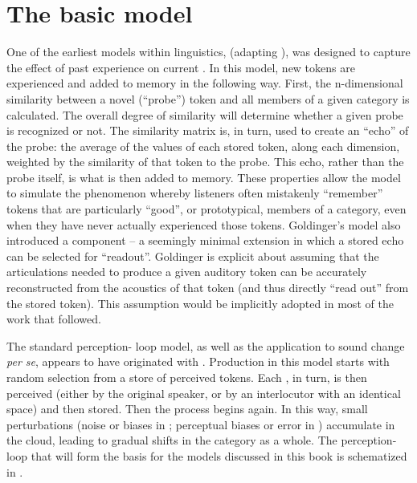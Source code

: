 \chapter{The basic model}\label{ch:The-Exemplar-Model}

One of the earliest  models within linguistics, \citet{Goldinger1996}
(adapting \citealt{hintzman1984minerva}), was designed to capture the
effect of past experience on current . In this model, new
tokens are experienced and added to memory in the following way. First,
the n-dimensional similarity between a novel (``probe'') token and all
members of a given category is calculated. The overall degree of
similarity will determine whether a given probe is recognized or not.
The similarity matrix is, in turn, used to create an ``echo'' of the
probe: the average of the values of each stored token, along each
dimension, weighted by the similarity of that token to the probe. This echo, rather
than the probe itself, is what is then added to memory. These properties
allow the model to simulate the phenomenon whereby listeners often
mistakenly ``remember'' tokens that are particularly ``good'', or prototypical,
members of a category, even when they have never actually experienced
those tokens. Goldinger's model also introduced a  component
– a seemingly minimal extension in which a stored echo can be selected
for ``readout''. Goldinger is explicit about assuming that the articulations
needed to produce a given auditory token can be accurately reconstructed
from the acoustics of that token (and thus directly ``read out'' from
the stored  token). This assumption would be implicitly
adopted in most of the work that followed. 

The standard perception- loop model, as well as the application
to sound change \emph{per se}, appears to have originated with \citet{Pierrehumbert2000}.
Production in this model starts with random selection from a store
of perceived tokens. Each , in turn, is then perceived (either
by the original speaker, or by an interlocutor with an identical 
space) and then stored. Then the process begins again. In this way,
small perturbations (noise or  biases in ; perceptual
biases or error in ) accumulate in the  cloud, leading
to gradual shifts in the category as a whole. The perception-
loop that will form the basis for the models discussed in this book
is schematized in .

